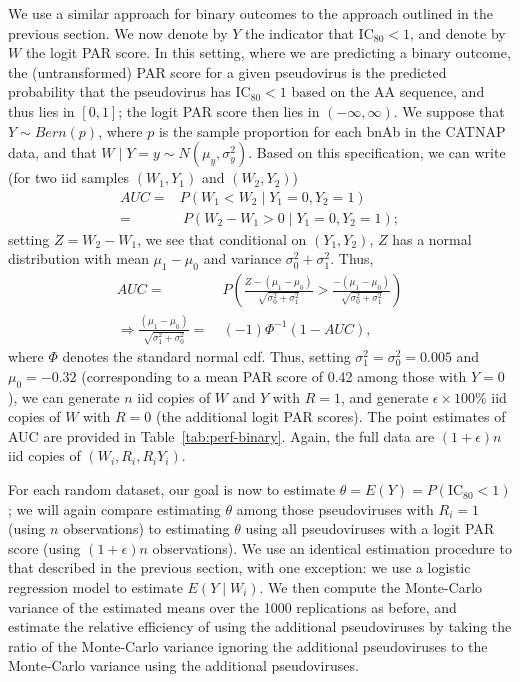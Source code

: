 \documentclass[10pt]{article}
\begin{document}
We use a similar approach for binary outcomes to the approach outlined in the previous section. We now denote by $Y$ the indicator that IC$_{80} < 1$, and denote by $W$ the logit PAR score. In this setting, where we are predicting a binary outcome, the (untransformed) PAR score for a given pseudovirus is the predicted probability that the pseudovirus has IC$_{80} < 1$ based on the AA sequence, and thus lies in $[0,1]$; the logit PAR score then lies in $(-\infty, \infty)$. We suppose that $Y \sim Bern(p)$, where $p$ is the sample proportion for each bnAb in the CATNAP data, and that $W \mid Y = y \sim N(\mu_y, \sigma^2_y)$. Based on this specification, we can write (for two iid samples $(W_1, Y_1)$ and $(W_2, Y_2)$)
\begin{align*}
    AUC =& P(W_1 < W_2 \mid Y_1 = 0, Y_2 = 1) \\
    =& \ P(W_2 - W_1 > 0 \mid Y_1 = 0, Y_2 = 1);
\end{align*}
setting $Z = W_2 - W_1$, we see that conditional on $(Y_1, Y_2)$, $Z$ has a normal distribution with mean $\mu_1 - \mu_0$ and variance $\sigma^2_0 + \sigma^2_1$. Thus,
\begin{align*}
    AUC =& \ P\left(\frac{Z - (\mu_1 - \mu_0)}{\sqrt{\sigma^2_0 + \sigma^2_1}} > \frac{- (\mu_1 - \mu_0)}{\sqrt{\sigma^2_0 + \sigma^2_1}}\right) \\
    \Rightarrow \frac{(\mu_1 - \mu_0)}{\sqrt{\sigma^2_1 + \sigma^2_0}} =& \ (-1)\Phi^{-1}(1 - AUC),
\end{align*}
where $\Phi$ denotes the standard normal cdf. Thus, setting $\sigma^2_1 = \sigma^2_0 = 0.005$ and $\mu_0 = -0.32$ (corresponding to a mean PAR score of 0.42 among those with $Y = 0$), we can generate $n$ iid copies of $W$ and $Y$ with $R = 1$, and generate $\epsilon \times 100$\% iid copies of $W$ with $R = 0$ (the additional logit PAR scores). The point estimates of AUC are provided in Table~\ref{tab:perf-binary}. Again, the full data are $(1 + \epsilon)n$ iid copies of $(W_i, R_i, R_iY_i)$.

For each random dataset, our goal is now to estimate $\theta = E(Y) = P(\text{IC}_{80} < 1)$; we will again compare estimating $\theta$ among those pseudoviruses with $R_i = 1$ (using $n$ observations) to estimating $\theta$ using all pseudoviruses with a logit PAR score (using $(1+\epsilon)n$ observations). We use an identical estimation procedure to that described in the previous section, with one exception: we use a logistic regression model to estimate $E(Y \mid W_i)$. We then compute the Monte-Carlo variance of the estimated means over the 1000 replications as before, and estimate the relative efficiency of using the additional pseudoviruses by taking the ratio of the Monte-Carlo variance ignoring the additional pseudoviruses to the Monte-Carlo variance using the additional pseudoviruses.
\end{document}
